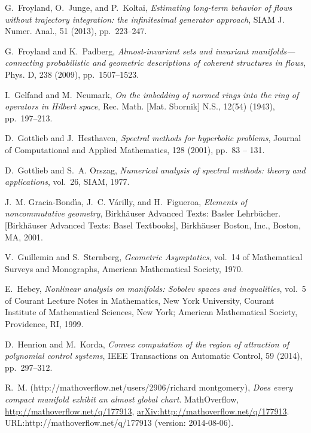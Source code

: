 \documentclass[final,leqno]{siamart}
\begin{document}
\begin{thebibliography}{10}
{\sc G.~Froyland, O.~Junge, and P.~Koltai}, {\em Estimating long-term behavior
  of flows without trajectory integration: the infinitesimal generator
  approach}, SIAM J. Numer. Anal., 51 (2013), pp.~223--247.

{\sc G.~Froyland and K.~Padberg}, {\em Almost-invariant sets and invariant
  manifolds---connecting probabilistic and geometric descriptions of coherent
  structures in flows}, Phys. D, 238 (2009), pp.~1507--1523.

{\sc I.~Gelfand and M.~Neumark}, {\em On the imbedding of normed rings into the
  ring of operators in {H}ilbert space}, Rec. Math. [Mat. Sbornik] N.S., 12(54)
  (1943), pp.~197--213.

{\sc D.~Gottlieb and J.~Hesthaven}, {\em Spectral methods for hyperbolic
  problems}, Journal of Computational and Applied Mathematics, 128 (2001),
  pp.~83 -- 131.

{\sc D.~Gottlieb and S.~A. Orszag}, {\em Numerical analysis of spectral
  methods: theory and applications}, vol.~26, SIAM, 1977.

{\sc J.~M. Gracia-Bond{\'{\i}}a, J.~C. V{\'a}rilly, and H.~Figueroa}, {\em
  Elements of noncommutative geometry}, Birkh\"auser Advanced Texts: Basler
  Lehrb\"ucher. [Birkh\"auser Advanced Texts: Basel Textbooks], Birkh\"auser
  Boston, Inc., Boston, MA, 2001.

{\sc V.~Guillemin and S.~Sternberg}, {\em Geometric Asymptotics}, vol.~14 of
  Mathematical Surveys and Monographs, American Mathematical Society, 1970.

{\sc E.~Hebey}, {\em Nonlinear analysis on manifolds: {S}obolev spaces and
  inequalities}, vol.~5 of Courant Lecture Notes in Mathematics, New York
  University, Courant Institute of Mathematical Sciences, New York; American
  Mathematical Society, Providence, RI, 1999.

{\sc D.~Henrion and M.~Korda}, {\em Convex computation of the region of
  attraction of polynomial control systems}, IEEE Transactions on Automatic
  Control, 59 (2014), pp.~297--312.

{\sc R.~M. (http://mathoverflow.net/users/2906/richard montgomery)}, {\em Does
  every compact manifold exhibit an almost global chart}.
\newblock MathOverflow, \url{http://mathoverflow.net/q/177913},
  \href{http://arxiv.org/abs/http://mathoverflow.net/q/177913}{arXiv:http://mathoverflow.net/q/177913}.
\newblock URL:http://mathoverflow.net/q/177913 (version: 2014-08-06).


\end{thebibliography}
\end{document}
